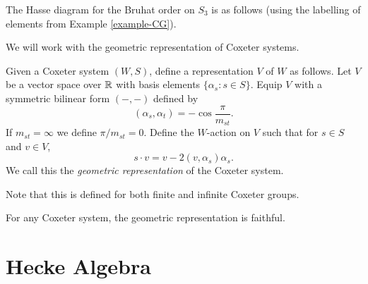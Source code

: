 
\begin{example}
    The Hasse diagram for the Bruhat order on $S_3$ is as follows (using the labelling of elements from Example \ref{example-CG}).
    \begin{center}
    \end{center}
\end{example}


We will work with the geometric representation of Coxeter systems.

\begin{definition}
    Given a Coxeter system $(W,S)$, define a representation $V$ of $W$ as follows. Let $V$ be a vector space over $\mathbb{R}$ with basis elements $\{\alpha_s : s \in S\}$. Equip $V$ with a symmetric bilinear form $(-,-)$ defined by
    \[
        (\alpha_s, \alpha_t) = - \cos \frac{\pi}{m_{st}}.
    \]
    If $m_{st} = \infty$ we define $\pi/m_{st} = 0$. Define the $W$-action on $V$ such that for $s \in S$ and $v \in V$,
    \[
        s \cdot v = v - 2(v,\alpha_s) \alpha_s.
    \]
    We call this the \textit{geometric representation} of the Coxeter system.
\end{definition}

Note that this is defined for both finite and infinite Coxeter groups.

\begin{proposition}
    For any Coxeter system, the geometric representation is faithful.
\end{proposition}


\section{Hecke Algebra}


